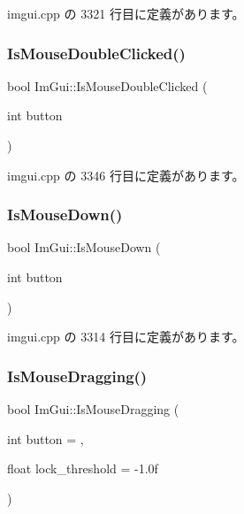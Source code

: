  imgui.\+cpp の 3321 行目に定義があります。

\mbox{\label{namespace_im_gui_a0d39701e7a0d7629e1b96b68e935542e}} 
\subsubsection{\texorpdfstring{Is\+Mouse\+Double\+Clicked()}{IsMouseDoubleClicked()}}
{\footnotesize\ttfamily bool Im\+Gui\+::\+Is\+Mouse\+Double\+Clicked (\begin{DoxyParamCaption}\item[{int}]{button }\end{DoxyParamCaption})}



 imgui.\+cpp の 3346 行目に定義があります。

\mbox{\label{namespace_im_gui_a8ddf4d05de8ab8b9aa70906a22a9973e}} 
\subsubsection{\texorpdfstring{Is\+Mouse\+Down()}{IsMouseDown()}}
{\footnotesize\ttfamily bool Im\+Gui\+::\+Is\+Mouse\+Down (\begin{DoxyParamCaption}\item[{int}]{button }\end{DoxyParamCaption})}



 imgui.\+cpp の 3314 行目に定義があります。

\mbox{\label{namespace_im_gui_a7905828a024c6c005fa1887e62235ca4}} 
\subsubsection{\texorpdfstring{Is\+Mouse\+Dragging()}{IsMouseDragging()}}
{\footnotesize\ttfamily bool Im\+Gui\+::\+Is\+Mouse\+Dragging (\begin{DoxyParamCaption}\item[{int}]{button = {},  }\item[{float}]{lock\+\_\+threshold = {\ttfamily -\/1.0f} }\end{DoxyParamCaption})}



